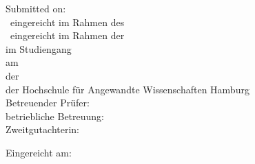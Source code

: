 {\begin{textblock*}{\textwidth}
\begin{minipage}[b]{\textwidth}
        Submitted on: \ISubDate \\
      \else
      	\ifdefined\IisInternshipReport
        \IthesisKindDE ~eingereicht im Rahmen des \IthesisExaminationDE \\	
	\else
        \IthesisKindDE ~eingereicht im Rahmen der \IthesisExaminationDE \\
        \fi
	im Studiengang \textit{\IstudyCourseName} \\
        am \IthesisDepartmentFull \\
        der \IthesisFacultyFull \\
        der Hochschule für Angewandte Wissenschaften Hamburg\\

        Betreuender Prüfer: \IfirstSv \\
        \ifdefined\IisTermPaper
        \else
          \ifdefined\IisInternshipReport
        betriebliche Betreuung: \IsecondSv \\							
	  \else
        Zweitgutachterin: \IsecondSv \\
        \fi\fi

        Eingereicht am: \ISubDate \\
      \fi
    \end{minipage}
  \end{textblock*}
}
